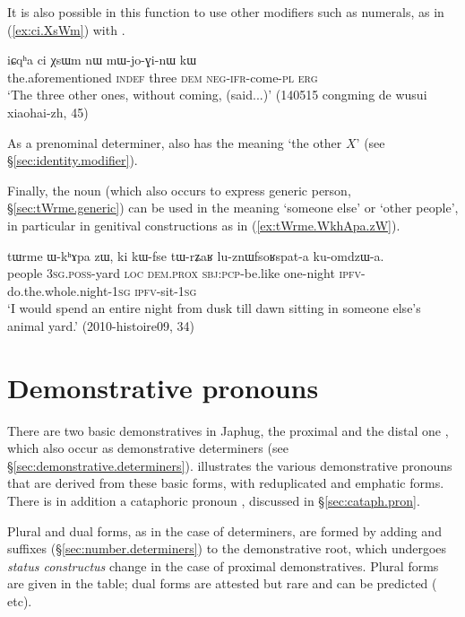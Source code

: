 It is also possible in this function to use other modifiers such as numerals, as in (\ref{ex:ci.XsWm}) with . 

 \begin{exe}
\ex \label{ex:ci.XsWm}
 \gll iɕqʰa ci χsɯm nɯ mɯ-jo-ɣi-nɯ kɯ  \\
 the.aforementioned \textsc{indef} three \textsc{dem} \textsc{neg}-\textsc{ifr}-come-\textsc{pl} \textsc{erg} \\
\glt `The three other ones, without coming, (said...)' (140515 congming de wusui xiaohai-zh, 45)
 \end{exe}

As a prenominal determiner,  also has the meaning `the other $X$' (see §\ref{sec:identity.modifier}).


Finally, the noun  (which also occurs to express generic person, §\ref{sec:tWrme.generic}) can be used in the meaning `someone else' or `other people',  in particular in genitival constructions as in (\ref{ex:tWrme.WkhApa.zW}).

\begin{exe}
\ex \label{ex:tWrme.WkhApa.zW}
\gll tɯrme ɯ-kʰɤpa zɯ, ki kɯ-fse tɯ-rʑaʁ lu-znɯfsoʁspat-a ku-omdzɯ-a. \\
people \textsc{3sg}.\textsc{poss}-yard \textsc{loc} \textsc{dem}.\textsc{prox} \textsc{sbj}:\textsc{pcp}-be.like one-night \textsc{ipfv}-do.the.whole.night-\textsc{1sg} \textsc{ipfv}-sit-\textsc{1sg} \\
\glt `I would spend an entire night from dusk till dawn sitting in someone else's animal yard.' (2010-histoire09, 34)
\end{exe} 

\section{Demonstrative pronouns} \label{sec:demonstrative.pronouns}
There are two basic demonstratives in Japhug, the proximal  and the distal one , which also occur as demonstrative determiners (see §\ref{sec:demonstrative.determiners}).  illustrates the various demonstrative pronouns that are derived from these basic forms, with reduplicated and emphatic forms. There is in addition a cataphoric pronoun , discussed in §\ref{sec:cataph.pron}.

Plural and dual forms, as in the case of determiners, are formed by adding  and  suffixes (§\ref{sec:number.determiners}) to the demonstrative root, which undergoes \textit{status constructus} change  \fl{}  in the case of proximal demonstratives. Plural forms are given in the table; dual forms are attested but rare and can be predicted ( etc).

